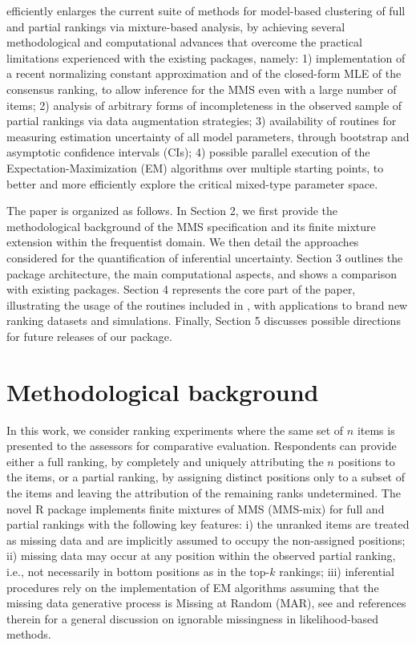  efficiently enlarges the current suite of methods for model-based clustering of full and partial rankings via mixture-based analysis, by achieving several methodological and computational advances that overcome the practical limitations experienced with the existing packages, namely: 1) implementation of a recent normalizing constant approximation and of the closed-form MLE of the consensus ranking, to allow inference for the MMS even with a large number of items; 2) analysis of arbitrary forms of incompleteness in the observed sample of partial rankings via data augmentation strategies; 3) availability of routines for measuring estimation uncertainty of all model parameters, through bootstrap and asymptotic confidence intervals (CIs); 4) possible parallel execution of the Expectation-Maximization (EM) algorithms over multiple starting points, to better and more efficiently explore the critical mixed-type parameter space. 

The paper is organized as follows. In Section 
2, we first provide the methodological background of the MMS specification and its finite mixture extension within the frequentist domain. We then detail the approaches considered for the quantification of inferential uncertainty. Section 3 outlines the package architecture, the main computational aspects, and shows a comparison with existing packages.  Section 
4 represents the core part of the paper, illustrating the usage of the routines included in , with applications to brand new ranking datasets and simulations.
Finally, Section 
5 discusses possible directions for future releases of our package.

\section{Methodological background}
\label{sec:background}

In this work, we consider ranking experiments where the same set of $n$ items is presented to the assessors for comparative evaluation. Respondents can provide either a full ranking, by completely and uniquely attributing the $n$ positions to the items, or a partial ranking, by assigning distinct positions only to a subset of the items and leaving the attribution of the remaining ranks undetermined. The novel \textsf{R} package  implements finite mixtures of MMS (MMS-mix) for full and partial rankings with the following key features: i) the unranked items are treated as missing data and are implicitly assumed to occupy the non-assigned positions; ii) missing data may occur at any position within the observed partial ranking, i.e., not necessarily in bottom positions as in the top-$k$ rankings; iii) inferential procedures rely on the implementation of EM algorithms assuming that the missing data generative process is Missing at Random (MAR),
see \cite{little2011calibrated} and references therein for a general discussion on ignorable missingness in likelihood-based methods.

